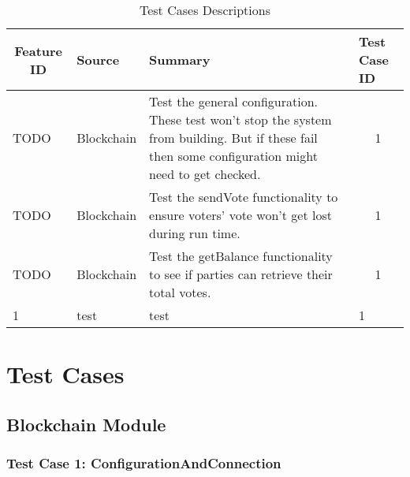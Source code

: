 \documentclass[11pt]{article}
\begin{document}
	\FloatBarrier
\begin{table}[]
	\centering
	\caption{Test Cases Descriptions}
	\label{my-label}
	\begin{tabular}{p{3cm}|p{2cm}|p{6cm}|p{2.5cm}}
		\toprule
		\multicolumn{1}{c|}{\textbf{Feature ID}} & \multicolumn{1}{l|}{\textbf{Source}} & \multicolumn{1}{l|}{\textbf{Summary}} & \textbf{Test Case ID} \\ \midrule

		\multicolumn{1}{p{0.75cm}}{TODO} & \multicolumn{1}{p{2cm}}{Blockchain} & \multicolumn{1}{p{6cm}}{Test the general configuration. These test won't stop the system from building. But if these fail then some configuration might need to get checked.} & \multicolumn{1}{c}{1} \\ \midrule
		
		\multicolumn{1}{p{0.75cm}}{TODO} & \multicolumn{1}{p{2cm}}{Blockchain} & \multicolumn{1}{p{6cm}}{Test the sendVote functionality to ensure voters' vote won't get lost during run time.} & \multicolumn{1}{c}{1} \\ \midrule
		
		\multicolumn{1}{p{0.75cm}}{TODO} & \multicolumn{1}{p{2cm}}{Blockchain} & \multicolumn{1}{p{6cm}}{Test the getBalance functionality to see if parties can retrieve their total votes.} & \multicolumn{1}{c}{1} \\ \midrule
		
		\multicolumn{1}{l|}{1} & \multicolumn{1}{l|}{test} & \multicolumn{1}{l|}{test} & 1 \\ \bottomrule
	\end{tabular}
\end{table}

\FloatBarrier
	
	\section{Test Cases}
	\subsection{Blockchain Module}
	\subsubsection{Test Case 1: ConfigurationAndConnection}
\end{document}
